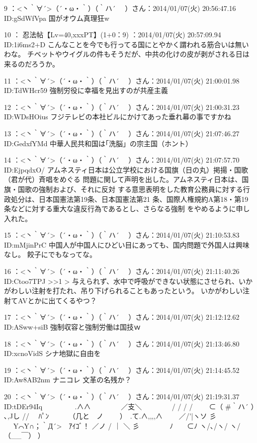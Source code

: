 9 ：<丶｀∀´>（´・ω・｀）（｀ハ´　 ）さん：2014/01/07(火) 20:56:47.16 ID:gSdWfVpa
    国がオウム真理狂w

10 ： 忍法帖【Lv=40,xxxPT】(1+0：9) ：2014/01/07(火) 20:57:09.94 ID:1i6ms2+D
    こんなことを今でも行ってる国にとやかく謂われる筋合いは無いわな。
    チベットやウイグルの件もそうだが、中共の化けの皮が剥がされる日は来るのだろうか。

11 ：<丶｀∀´>（´・ω・｀）（｀ハ´　 ）さん：2014/01/07(火) 21:00:01.98 ID:TdWHcr59
    強制労役に幸福を見出すのが共産主義

12 ：<丶｀∀´>（´・ω・｀）（｀ハ´　 ）さん：2014/01/07(火) 21:00:31.23 ID:WDsHOius
    フジテレビの本社ビルにかけてあった垂れ幕の事ですかね

13 ：<丶｀∀´>（´・ω・｀）（｀ハ´　 ）さん：2014/01/07(火) 21:07:46.27 ID:GedxfYMd
    中華人民共和国は｢洗脳」の宗主国（ホント）

14 ：<丶｀∀´>（´・ω・｀）（｀ハ´　 ）さん：2014/01/07(火) 21:07:57.70 ID:EjpqdxO/
    アムネスティ日本は公立学校における国旗（日の丸）掲揚・国歌（君が代）斉唱をめぐる
    問題に関して声明を出した。アムネスティ日本は、国旗・国歌の強制および、それに反対
    する意思表明をした教育公務員に対する行政処分は、日本国憲法第19条、日本国憲法第21
    条、国際人権規約A第18・第19条などに対する重大な違反行為であるとし、さらなる強制
    をやめるように申し入れた。

15 ：<丶｀∀´>（´・ω・｀）（｀ハ´　 ）さん：2014/01/07(火) 21:10:53.83 ID:mMjinPrC
    中国人が中国人にひどい目にあっても、国内問題で外国人は興味なし。
    餃子にでもなってな。

16 ：<丶｀∀´>（´・ω・｀）（｀ハ´　 ）さん：2014/01/07(火) 21:11:40.26 ID:Ctoo7TPJ
    >>1
    > 与えられず、水中で呼吸ができない状態にさせられ、いかがわしい注射を打たれ、吊り下げられることもあったという。
    いかがわしい注射てAVとかに出てくるやつ？

17 ：<丶｀∀´>（´・ω・｀）（｀ハ´　 ）さん：2014/01/07(火) 21:12:12.62 ID:ASww+siB
    強制収容と強制労働は国技ｗ

18 ：<丶｀∀´>（´・ω・｀）（｀ハ´　 ）さん：2014/01/07(火) 21:13:46.80 ID:xcnoVidS
    シナ地獄に自由を

19 ：<丶｀∀´>（´・ω・｀）（｀ハ´　 ）さん：2014/01/07(火) 21:14:45.52 ID:Aw8AB2nm
    ナニコレ
    文革の名残か？

20 ：<丶｀∀´>（´・ω・｀）（｀ハ´　 ）さん：2014/01/07(火) 21:19:31.37 ID:tDEr94Iq
    　　　　 .∧∧
    　　　　／支＼　　 　　/ / / /
    　　⊂（ #｀ハ´ ）　 ､,Jし //　 ﾊﾟﾝ
    　　　（几と　ノ　 　）　.て.∧,,,,∧
    　　／/'|ヽソ 彡 　 Y⌒Y∩；｀Д´>　ｱｲｺﾞ！
    ／ノ / ｜ ＼ 彡　　　 　ﾉ　　⊂ﾉ
    ヽ/､/ヽ/ ヽ/　　　　　（__￣） ）



